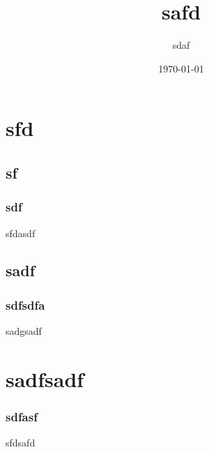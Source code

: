\documentclass{beamer}
\title{safd}
\author{sdaf}
\date{\today}
\begin{document}
\frame{\titlepage}

\section{sfd}
\subsection{sf}
\begin{frame}
    \frametitle{sdf}
    sfdasdf
\end{frame}

\subsection{sadf}
\begin{frame}
    \frametitle{sdfsdfa}
    sadgsadf
\end{frame}

\section{sadfsadf}
\begin{frame}
    \frametitle{sdfasf}
    sfdsafd
\end{frame}
\end{document}
